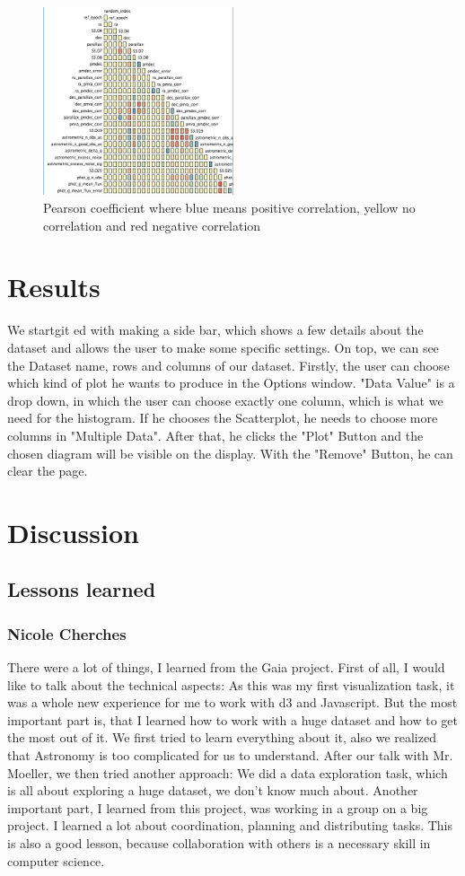 \documentclass{vgtc}                          %
\begin{document}
\begin{figure}[h]
\includegraphics[width=0.5\textwidth]{pearsoncoeff.PNG}
\centering
\caption{Pearson coefficient where blue means positive correlation, yellow no correlation and red negative correlation}
\end{figure}
\section{Results}
We startgit ed with making a side bar, which shows a few details about the dataset and allows the user to make some specific settings.
On top, we can see the Dataset name, rows and columns of our dataset.
Firstly, the user can choose which kind of plot he wants to produce in the Options window. 
"Data Value" is a drop down, in which the user can choose exactly one column, which is what we need for the histogram.
If he chooses the Scatterplot, he needs to choose more columns in "Multiple Data".
After that, he clicks the "Plot" Button and the chosen diagram will be visible on the display. With the "Remove" Button, he can clear the page.
\section{Discussion}
\subsection{Lessons learned}
\subsubsection{Nicole Cherches}
There were a lot of things, I learned from the Gaia project. First of all, I would like to talk about the technical aspects: As this was my first visualization task, it was a whole new experience for me to work with d3 and Javascript. But the most important part is, that I learned how to work with a huge dataset and how to get the most out of it. We first tried to learn everything about it, also we realized that Astronomy is too complicated for us to understand. After our talk with Mr. Moeller, we then tried another approach: We did a data exploration task, which is all about exploring a huge dataset, we don't know much about.  
Another important part, I learned from this project, was working in a group on a big project. I learned a lot about coordination, planning and distributing tasks. This is also a good lesson, because collaboration with others is a necessary skill in computer science.
\end{document}

